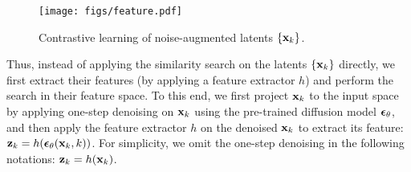 

\begin{wrapfigure}{r}{0.3\textwidth}
    \centering
    \vspace{5pt}
    \texttt{[image: figs/feature.pdf]}
    \caption{Contrastive learning of noise-augmented latents $\{{\mathbf{x}}_k\}$.}
    \label{fig:feature_extractor}
\end{wrapfigure}
Thus, instead of applying the similarity search on the latents $\{{\mathbf{x}}_k\}$ directly, we first extract their features (by applying a feature extractor $h$) and perform the search in their feature space. To this end, we first project ${\mathbf{x}}_k$ to the input space by applying one-step denoising on ${\mathbf{x}}_k$ using the pre-trained diffusion model $\bm{\epsilon}_\theta$, and then apply the feature extractor $h$ on the denoised ${\mathbf{x}}_k$ to extract its feature: ${\mathbf{z}}_k = h(\bm{\epsilon}_\theta({\mathbf{x}}_k, k))$. For simplicity, we omit the one-step denoising in the following notations: ${\mathbf{z}}_k = h({\mathbf{x}}_k)$.  

